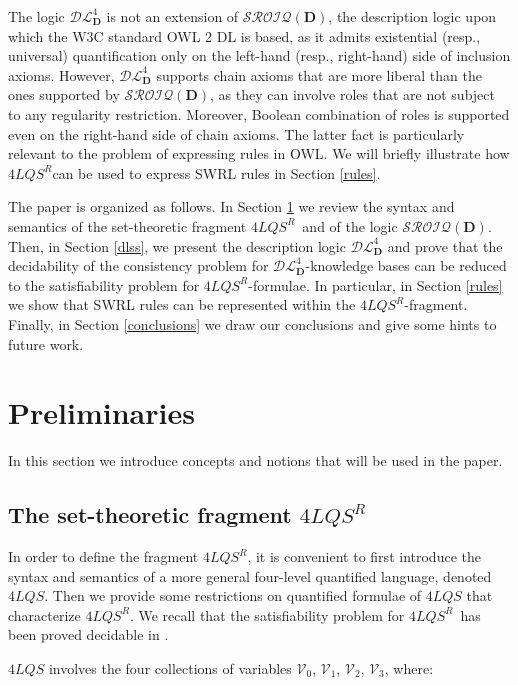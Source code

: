 \documentclass[a4paper]{llncs}
\newcommand{\shdlss}{\mathcal{DL}_{\D}^{4}}
\newcommand{\sroiqd}{\ensuremath{\mathcal{SROIQ}(\D)}}
\newcommand{\flqsr}{\ensuremath{4LQS^R}}
\newcommand{\D}{\mathbf{D}}
\begin{document}
The logic $\shdlss$ is not an extension of \sroiqd, the description logic upon which the W3C standard OWL 2 DL is based, as it admits existential (resp., universal) quantification only on the left-hand (resp., right-hand) side of inclusion axioms. However, $\shdlss$ supports chain axioms that are more liberal than the ones supported by \sroiqd, as they can involve roles that are not subject to any regularity restriction. Moreover, Boolean combination of roles is supported even on the right-hand side of chain axioms. The latter fact is particularly relevant to the problem of expressing rules in OWL. We will
briefly illustrate how \flqsr\space can be used to express SWRL rules in Section \ref{rules}.








The paper is organized as follows. In Section \ref{prelim} we review the syntax and semantics of the set-theoretic fragment \flqsr\ and of the logic \sroiqd. Then, in Section \ref{dlss}, we present the description logic $\shdlss$ and prove that the decidability of the consistency problem for $\shdlss$-knowledge bases can be reduced to the satisfiability problem for \flqsr-formulae. In particular, in Section \ref{rules} we show that SWRL rules can be represented within the \flqsr-fragment. Finally, in Section \ref{conclusions} we draw our conclusions and give some hints to future work.






\section{Preliminaries}\label{prelim}
In this section we introduce concepts and notions that will be used in the paper.

\subsection{The set-theoretic fragment \flqsr} \label{4LQS}
In order to define the fragment \flqsr, it is convenient to first introduce the syntax and semantics of a more general four-level quantified language, denoted $4LQS$.
Then we provide some restrictions on quantified formulae of $4LQS$ that characterize \flqsr.
We recall that the satisfiability problem for \flqsr\ has been proved decidable in \cite{CanNic2013}.

$4LQS$ involves the four collections of variables $\mathcal{V}_0$, $\mathcal{V}_1$, $\mathcal{V}_2$, $\mathcal{V}_3$, where:
\end{document}
